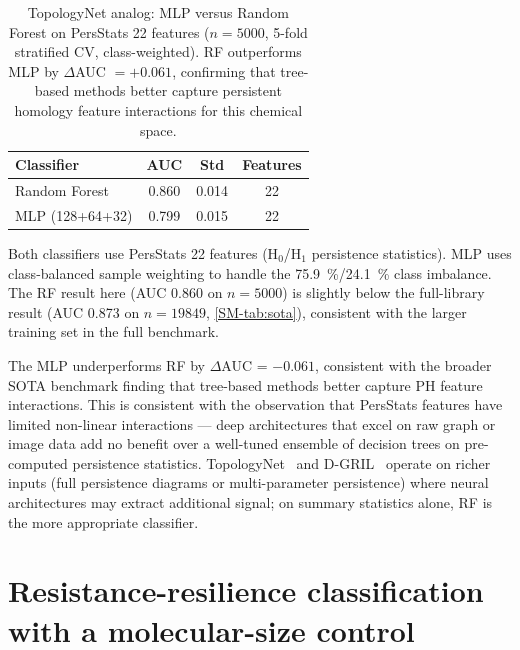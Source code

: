 \documentclass[11pt,a4paper]{article}
\begin{document}
\begin{table}[htbp]
\centering
\caption{TopologyNet analog: MLP versus Random Forest on PersStats 22 features ($n = \num{5000}$, 5-fold stratified CV, class-weighted). RF outperforms MLP by $\Delta$AUC $= +\num{0.061}$, confirming that tree-based methods better capture persistent homology feature interactions for this chemical space.}
\label{tab:topologynet_analog}
\begin{tabularx}{\textwidth}{l S[table-format=1.4] S[table-format=1.4] S[table-format=1.0]}
\toprule
{Classifier} & {AUC} & {Std} & {Features} \\
\midrule
Random Forest & 0.860 & 0.014 & 22 \\
MLP (128+64+32) & 0.799 & 0.015 & 22 \\
\bottomrule
\end{tabularx}
\vspace{1mm}
\footnotesize Both classifiers use PersStats 22 features (H$_0$/H$_1$ persistence statistics). MLP uses class-balanced sample weighting to handle the \qty{75.9}{\percent}/\qty{24.1}{\percent} class imbalance. The RF result here (AUC \num{0.860} on $n = \num{5000}$) is slightly below the full-library result (AUC \num{0.873} on $n = \num{19849}$, \cref{SM-tab:sota}), consistent with the larger training set in the full benchmark.
\end{table}

The MLP underperforms RF by $\Delta$AUC = $-0.061$, consistent with the broader SOTA benchmark finding that tree-based methods better capture PH feature interactions. This is consistent with the observation that PersStats features have limited non-linear interactions --- deep architectures that excel on raw graph or image data add no benefit over a well-tuned ensemble of decision trees on pre-computed persistence statistics. TopologyNet~\citep{topologynet_2018} and D-GRIL~\citep{dgril_2026} operate on richer inputs (full persistence diagrams or multi-parameter persistence) where neural architectures may extract additional signal; on summary statistics alone, RF is the more appropriate classifier.

\vspace{4mm}


\section{Resistance-resilience classification with a molecular-size control}
\label{SM-sec:resistance_benchmark}
\end{document}
